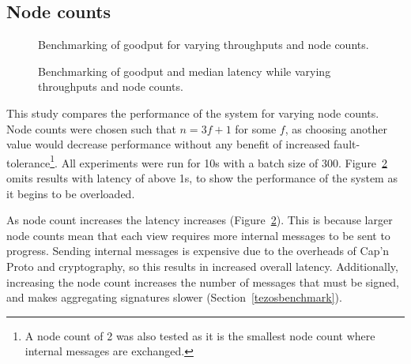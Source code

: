 
\subsection{Node counts} \label{nodecountseval}

\begin{figure}[h!]
\centering
\resizebox{.6\textwidth}{!}{}
\caption{Benchmarking of goodput for varying throughputs and node counts.}
\label{throughputgoodputnodes}
\end{figure}

\begin{figure}[h!]
\centering
\resizebox{.6\textwidth}{!}{}
\caption{Benchmarking of goodput and median latency while varying throughputs and node counts.}
\label{goodputlatencynodes}
\end{figure}

% 

This study compares the performance of the system for varying node counts. Node counts were chosen such that $n = 3f + 1$ for some $f$, as choosing another value would decrease performance without any benefit of increased fault-tolerance\footnote{A node count of 2 was also tested as it is the smallest node count where internal messages are exchanged.}. All experiments were run for 10s with a batch size of 300. Figure~\ref{goodputlatencynodes} omits results with latency of above 1s, to show the performance of the system as it begins to be overloaded.

As node count increases the latency increases (Figure~\ref{goodputlatencynodes}). This is because larger node counts mean that each view requires more internal messages to be sent to progress. Sending internal messages is expensive due to the overheads of Cap'n Proto and cryptography, so this results in increased overall latency. Additionally, increasing the node count increases the number of messages that must be signed, and makes aggregating signatures slower (Section~\ref{tezosbenchmark}).


